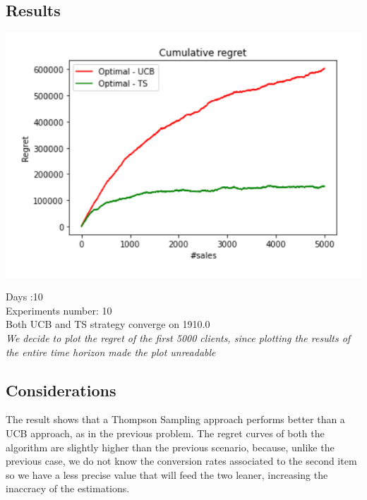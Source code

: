 \subsection*{Results}
\begin{center}
	\includegraphics[scale=1.2]{Images/n4}
\end{center}
Days :10\\
Experiments number: 10 \\
Both UCB and TS strategy converge on 1910.0\\
\textit{We decide to plot the regret of the first 5000 clients, since plotting the results of the entire time horizon made the plot unreadable}

\subsection*{Considerations}
The result shows that a Thompson Sampling approach performs better than a UCB approach, as in the previous problem. The regret curves of both the algorithm are slightly higher than the previous scenario, because, unlike the previous case, we do not know the conversion rates associated to the second item so we have a less precise value that will feed the two leaner, increasing the inaccracy of the estimations.  
